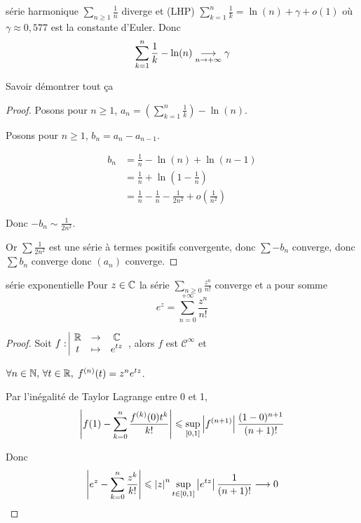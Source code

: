 \begin{proposition}{série harmonique}{}
    $\displaystyle \sum_{n \geqslant 1} \frac 1 n$ diverge et (LHP)
    $\displaystyle \sum_{k = 1 }^{n } \frac 1 k = \ln(n) + \gamma + o(1)$ où $\gamma \approx 0,577$ est la constante d'Euler.
    Donc 
    $$\displaystyle \sum_{k = 1}^{n} \frac 1 k - \ln(n) \underset{n \to + \infty}{\longrightarrow} \gamma$$
\end{proposition}

Savoir démontrer tout ça 


\begin{proof}
    Posons pour $n \geqslant 1$, $\displaystyle a_n = \left( \sum_{k = 1 }^{n } \frac 1 k \right) - \ln(n)$.

    Posons pour $n \geqslant 1$, $b_n = a_n - a_{n - 1}$. 

    \begin{align*}
        b_n & = \frac 1 n - \ln(n) + \ln(n - 1) \\
            & = \frac 1 n + \ln\left( 1 - \frac 1 n \right) \\
            & = \frac 1 n -  \frac 1 n - \frac 1 {2 n^2} + o\left( \frac 1 {n^2} \right) 
    \end{align*}

    Donc $- b_n \sim \frac 1 {2 n^2}$.

    Or $\sum \frac 1 {2 n^2}$ est une série à termes positifs convergente, donc 
    $\sum - b_n$ converge, donc $\sum b_n$ converge donc $(a_n)$ converge.
\end{proof}

\begin{proposition}{série exponentielle}{}
    Pour $z \in \mathbb{C}$ la série $\sum_{n \geqslant 0} \frac{z^n}{n!}$ converge et a pour somme 
    $$e^z = \sum_{n = 0}^{+\infty} \frac{z^n}{n!}$$
\end{proposition}


\begin{proof}
    Soit $f: \space \begin{array}{|ccc} \displaystyle \mathbb{R} & \to & \displaystyle \mathbb{C} \\ \displaystyle t & \mapsto & \displaystyle e^{tz} \end{array}$, alors $f$ est $\mathscr C^\infty$ et 
    
    $\forall n \in \mathbb{N}, \, \forall t \in \mathbb{R}, \; f^{(n)}(t) = z^n e^{tz}$.

    Par l'inégalité de Taylor Lagrange entre 0 et 1, 
    $$\left|f(1) - \sum_{k = 0}^{n} \frac{f^{(k)}(0)t^k}{k!}\right| \leqslant \sup_{[0, 1]}\left|f^{(n + 1)}\right| \frac{(1 - 0)^{n + 1}}{(n + 1)!}$$

    Donc 
    $$\left|e^z - \sum_{k = 0 }^{n }\frac{z^k}{k!}\right| \leqslant \left|z\right| ^n \sup_{t \in [0, 1]} \left|e^{tz}\right| \frac{1}{(n + 1)!} \longrightarrow 0$$
\end{proof}

